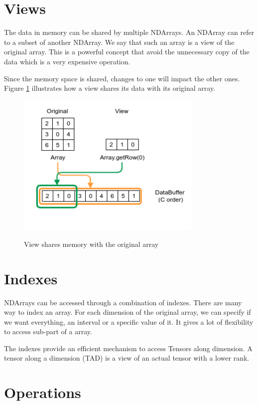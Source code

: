 \section{Views}

The data in memory can be shared by multiple NDArrays. An NDArray can refer to a subset of another NDArray. We say that such an array is a view of the original array. This is a powerful concept that avoid the unnecessary copy of the data which is a very expensive operation.

Since the memory space is shared, changes to one will impact the other ones. Figure \ref{fig:sharememView} illustrates how a view shares its data with its original array.

\begin{figure}[h]
	\begin{center}
		\includegraphics[width=3.5in]{images/views.png} 
		\label{fig:sharememView}
		\caption{View shares memory with the original array}
	\end{center}
\end{figure}
\section{Indexes}

NDArrays can be accessed through a combination of indexes. There are many way to index an array. For each dimension of the original array, we can specify if we want everything, an interval or a specific value of it. It gives a lot of flexibility to access sub-part of a array. 
 
The indexes provide an efficient mechanism to access Tensors along dimension. A tensor along a dimension (TAD) is a view of an actual tensor with a lower rank.

\section{Operations}

